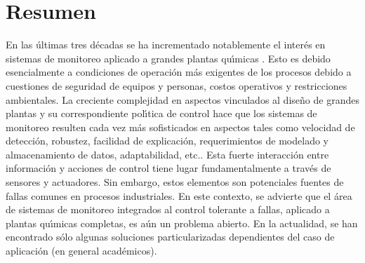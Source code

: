 \chapter*{Resumen}
En las {\'u}ltimas tres d{\'e}cadas se ha incrementado notablemente el inter{\'e}s en sistemas de monitoreo aplicado a
grandes plantas qu{\'\i}micas . Esto es debido esencialmente a condiciones de operaci{\'o}n m{\'a}s exigentes de los
procesos debido a cuestiones de seguridad de equipos y personas, costos operativos y restricciones
ambientales. La creciente complejidad en aspectos vinculados al dise{\~n}o de grandes plantas y su
correspondiente pol{\'\i}tica de control hace que los sistemas de monitoreo resulten cada vez m{\'a}s sofisticados en
aspectos tales como velocidad de detecci{\'o}n, robustez, facilidad de explicaci{\'o}n, requerimientos de modelado y
almacenamiento de datos, adaptabilidad, etc.. Esta fuerte interacci{\'o}n entre informaci{\'o}n y acciones de
control tiene lugar fundamentalmente a trav{\'e}s de sensores y actuadores. Sin embargo, estos elementos son
potenciales fuentes de fallas comunes en procesos industriales. En este contexto, se advierte que el {\'a}rea de
sistemas de monitoreo integrados al control tolerante a fallas, aplicado a plantas qu{\'\i}micas completas, es
a{\'u}n un problema abierto. En la actualidad, se han encontrado s{\'o}lo algunas soluciones particularizadas
dependientes del caso de aplicaci{\'o}n (en general acad{\'e}micos).

